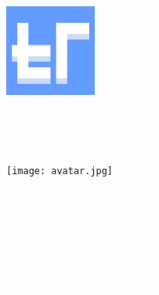 \documentclass[12pt]{article}
\begin{document}
\pagecolor{lb}\afterpage{\nopagecolor}

\begin{titlepage}

    \noindent\begin{minipage}{0.3\textwidth}%
        \includegraphics[width=3cm, height=3cm]{logo 512.png}
    \end{minipage}%
    \hfill%
    \begin{minipage}{0.6\textwidth}\raggedleft
        \fontsize{40}{40}\selectfont\textcolor{white}{
            \begin{flushleft}
                TwittReport
            \end{flushleft}
        }
    \end{minipage}
    \vspace{0.8cm}


    \begin{minipage}{0.75\linewidth}
        \fontsize{20}{20}\selectfont\textcolor{white}{
            \begin{flushleft}
                \textbf{Username: @USERNAME}
            \end{flushleft}
        }
    \end{minipage}
    \hfil
    \begin{minipage}{0.2\linewidth}
        \texttt{[image: avatar.jpg]}
    \end{minipage}%


    \vspace{0.8cm}
    \noindent
    \LARGE
    \fontsize{20}{20}\selectfont\textcolor{white}{\textbf{
            Top 5 Mentions:\\\\
        }}
    \LARGE
    \fontsize{15}{15}\selectfont\textcolor{white}{\textbf{
            @MENTIONS
        }}

    \vspace{0.5cm}
    \noindent
    \LARGE
    \fontsize{20}{20}\selectfont\textcolor{white}{\textbf{
            Top 5 Hashtags:\\\\
        }}
    \LARGE
    \fontsize{15}{15}\selectfont\textcolor{white}{\textbf{
            @HASHTAGS
        }}
    \vspace{0.5cm}


\end{titlepage}
\end{document}
